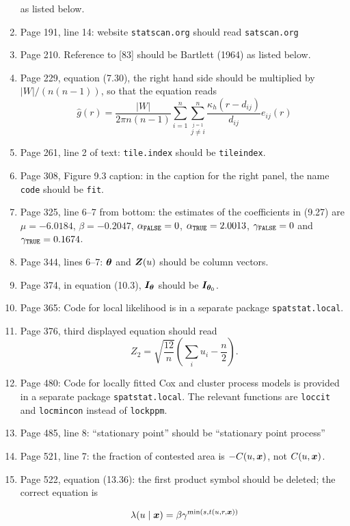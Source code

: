 \documentclass[12pt,a4paper]{article}
\newcommand{\boldmaths}[1]{{\ensuremath\boldsymbol{#1}}}
\newcommand{\bx}{\boldmaths x}
\newcommand{\bZ}{\boldmaths Z}
\newcommand{\btheta}{\boldmaths\theta}
\newcommand{\suminej}{\sum_{i=1}^n \sum_{\stackrel{j=1}{\!\!j \neq i}}^n}
\begin{document}
\begin{enumerate}
  as listed below.
\item Page 191, line 14: 
 website \texttt{statscan.org} should read \texttt{satscan.org}
\item Page 210. Reference to [83] should be Bartlett (1964)
  as listed below.
\item Page 229, equation (7.30), the right hand side should
  be multiplied by $|W|/(n(n-1))$, so that the equation reads
  \[
  \widehat g(r) = \frac {|W|}{2\pi n(n-1)}
  \suminej \frac{
    \kappa_h(r - d_{ij})
  }{
    d_{ij}
  } e_{ij}(r)
  \]
\item Page 261, line 2 of text: 
\texttt{tile.index} should be \texttt{tileindex}.
\item Page 308, Figure 9.3 caption: in the caption for the right panel,
the name \texttt{code} should be \texttt{fit}.
\item Page 325, line 6--7 from bottom: the estimates of the coefficients
  in (9.27) are $\mu =-6.0184$, $\beta=-0.2047$,
  $\alpha_{\mbox{\scriptsize \texttt{FALSE}}} = 0$,
  $\alpha_{\mbox{\scriptsize \texttt{TRUE}}} = 2.0013$,
  $\gamma_{\mbox{\scriptsize \texttt{FALSE}}} = 0$ and
  $\gamma_{\mbox{\scriptsize \texttt{TRUE}}} = 0.1674$.
\item Page 344, lines 6--7: $\btheta$ and $\bZ(u)$ 
should be column vectors.
\item Page 374, in equation (10.3), ${\boldmaths I}_\btheta$
  should be ${\boldmaths I}_{\btheta_0}$.
\item Page 365: Code for local likelihood is in a separate package
  \texttt{spatstat.local}.
\item Page 376, third displayed equation should read
  \[
       Z_2 = \sqrt{\frac{12}{n}} \left(\sum_i u_i - \frac n 2\right).
  \]
\item Page 480: Code for locally fitted Cox and cluster process models
  is provided in a separate package \texttt{spatstat.local}.
  The relevant functions are \texttt{loccit} and \texttt{locmincon}
  instead of \texttt{lockppm}.
\item Page 485, line 8: ``stationary point'' should be
  ``stationary point process''
\item Page 521, line 7: the fraction of contested area is $-C(u, \bx)$,
not $C(u,\bx)$.
\item Page 522, equation (13.36): the first product symbol should be deleted;
  the correct equation is
  \begin{large}
  \[
    \lambda(u \mid \bx) =
    \beta
    \gamma^{\mbox{\scriptsize min} (s, t(u,r,\bx))}
\]
\end{large}
\end{enumerate}
\end{document}
